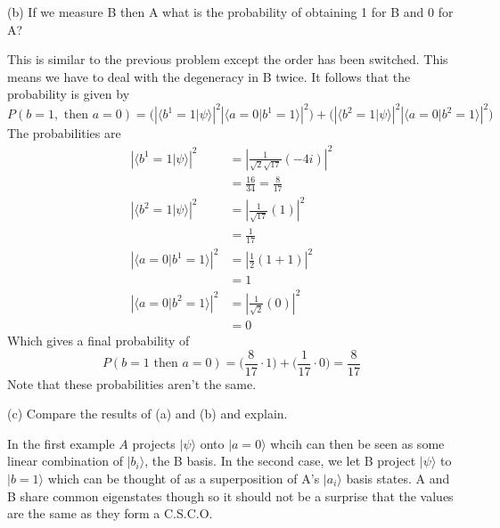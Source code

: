 \documentclass[a4paper, 11pt]{article}
\newcommand{\ket}[1]{|#1\rangle}
\newcommand{\braket}[2]{\langle #1 | #2 \rangle}
\newenvironment{solution}{%
	\begin{list}{}{%
			\setlength{\topsep}{0pt}%
			\setlength{\leftmargin}{1.5cm}%
			\setlength{\rightmargin}{1.5cm}%
			\setlength{\listparindent}{\parindent}%
			\setlength{\itemindent}{\parindent}%
			\setlength{\parsep}{\parskip}%
		}%
		\item[]}{\end{list}}
\begin{document}
\noindent(b) If we measure B then A what is the probability of obtaining 1 for B and 0 for A? \\
	\begin{solution}
		\noindent This is similar to the previous problem except the order has been switched. This means we have to deal with the degeneracy in B twice. It follows that the probability is given by 	
			\begin{equation*}
					P(b=1, \text{ then } a=0) = \Bigg(\left|\braket{b^1=1}{\psi}\right|^2 \left|\braket{a=0}{b^1=1}\right|^2\Bigg)+\Bigg( \left|\braket{b^2=1}{\psi}\right|^2\left|\braket{a=0}{b^2=1}\right|^2 \Bigg)
			\end{equation*}
		The probabilities are 
			\begin{align*}
				\left|\braket{b^1=1}{\psi}\right|^2 &= \left| \frac{1}{\sqrt{2}\sqrt{17}}(-4i) \right|^2 \\ 
					&= \frac{16}{34} = \frac{8}{17}\\
				\left|\braket{b^2=1}{\psi}\right|^2 &= \left|  \frac{1}{\sqrt{17}}(1)\right|^2 \\
					&= \frac{1}{17}\\
				\left|\braket{a=0}{b^1=1}\right|^2 &= \left|  \frac{1}{2}(1+1)\right|^2 \\
					&= 1 \\
				\left|\braket{a=0}{b^2=1}\right|^2 &= \left|\frac{1}{\sqrt{2}}(0)\right|^2 \\
					&= 0
			\end{align*}
		Which gives a final probability of 
			\begin{equation*}
				P(b=1 \text{ then } a=0) = \Big(\frac{8}{17}\cdot 1\Big)+ \Big(\frac{1}{17}\cdot 0\Big) = \frac{8}{17}
			\end{equation*}
		Note that these probabilities aren't the same. \\
	\end{solution}

\noindent (c) Compare the results of (a) and (b) and explain. \\
	\begin{solution}
		\noindent In the first example $A$ projects $\ket{\psi}$ onto $\ket{a=0}$ whcih can then be seen as some linear combination of $\ket{b_i}$, the B basis. In the second case, we let B project $\ket{\psi}$ to $\ket{b=1}$ which can be thought of as a superposition of A's $\ket{a_i}$ basis states. A and B share common eigenstates though so it should not be a surprise that the values are the same as they form a C.S.C.O.  \\
	\end{solution}
\end{document}
